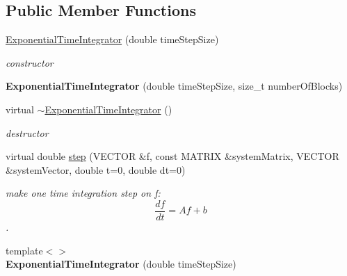 \subsection*{Public Member Functions}
\begin{DoxyCompactItemize}
\item 
\hypertarget{classnatrium_1_1ExponentialTimeIntegrator_a3a3e7b0c53b5c083dbdb7b3d625d8087}{
\hyperlink{classnatrium_1_1ExponentialTimeIntegrator_a3a3e7b0c53b5c083dbdb7b3d625d8087}{ExponentialTimeIntegrator} (double timeStepSize)}
\label{classnatrium_1_1ExponentialTimeIntegrator_a3a3e7b0c53b5c083dbdb7b3d625d8087}

\begin{DoxyCompactList}\small\item\em constructor \item\end{DoxyCompactList}\item 
\hypertarget{classnatrium_1_1ExponentialTimeIntegrator_a7da2892aead7c5e1fec82be549dcb37b}{
{\bfseries ExponentialTimeIntegrator} (double timeStepSize, size\_\-t numberOfBlocks)}
\label{classnatrium_1_1ExponentialTimeIntegrator_a7da2892aead7c5e1fec82be549dcb37b}

\item 
\hypertarget{classnatrium_1_1ExponentialTimeIntegrator_ad85e62117ec3dbfebfbccd6ad1135d8c}{
virtual \hyperlink{classnatrium_1_1ExponentialTimeIntegrator_ad85e62117ec3dbfebfbccd6ad1135d8c}{$\sim$ExponentialTimeIntegrator} ()}
\label{classnatrium_1_1ExponentialTimeIntegrator_ad85e62117ec3dbfebfbccd6ad1135d8c}

\begin{DoxyCompactList}\small\item\em destructor \item\end{DoxyCompactList}\item 
virtual double \hyperlink{classnatrium_1_1ExponentialTimeIntegrator_a656810a85c20b5f7eae422ee596fc340}{step} (VECTOR \&f, const MATRIX \&systemMatrix, VECTOR \&systemVector, double t=0, double dt=0)
\begin{DoxyCompactList}\small\item\em make one time integration step on f: \[ \frac{df}{dt} = Af+b \]. \item\end{DoxyCompactList}\item 
\hypertarget{classnatrium_1_1ExponentialTimeIntegrator_a7b68727897acae02ff025c39a56a4bf6}{
{\footnotesize template$<$$>$ }\\{\bfseries ExponentialTimeIntegrator} (double timeStepSize)}
\label{classnatrium_1_1ExponentialTimeIntegrator_a7b68727897acae02ff025c39a56a4bf6}


\end{DoxyCompactItemize}
